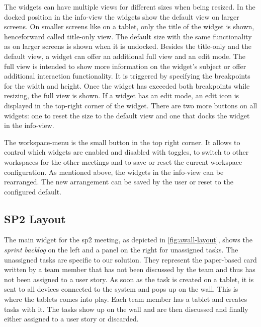 \documentclass{sigchi}
\begin{document}
The widgets can have multiple views for different sizes when being resized.
In the docked position in the info-view the widgets show the default view on larger screens. 
On smaller screens like on a tablet, only the title of the widget is shown, henceforward called title-only view.
The default size with the same functionality as on larger screens is shown when it is undocked.
Besides the title-only and the default view, a widget can offer an additional full view and an edit mode.
The full view is intended to show more information on the widget's subject or offer additional interaction functionality.
It is triggered by specifying the breakpoints for the width and height.
Once the widget has exceeded both breakpoints while resizing, the full view is shown.
If a widget has an edit mode, an edit icon is displayed in the top-right corner of the widget.
There are two more buttons on all widgets: one to reset the size to the default view and one that docks the widget in the info-view.


The workspace-menu is the small button in the top right corner.
It allows to control which widgets are enabled and disabled with toggles, to switch to other workspaces for the other meetings and to save or reset the current workspace configuration.
As mentioned above, the widgets in the info-view can be rearranged.
The new arrangement can be saved by the user or reset to the configured default.


\subsection{SP2 Layout}
The main widget for the \gls{sp2} meeting, as depicted in \ref{fig:awall-layout}, shows the \textit{sprint backlog} on the left and a panel on the right for unassigned tasks.
The unassigned tasks are specific to our solution.
They represent the paper-based card written by a team member that has not been discussed by the team and thus has not been assigned to a user story.
As soon as the task is created on a tablet, it is sent to all devices connected to the system and pops up on the wall.
This is where the tablets comes into play.
Each team member has a tablet and creates tasks with it.
The tasks show up on the wall and are then discussed and finally either assigned to a user story or discarded.
\end{document}
